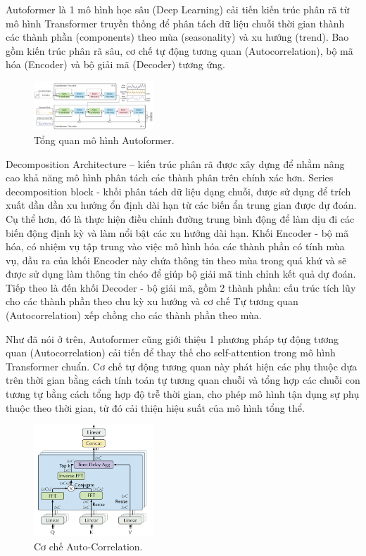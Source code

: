 Autoformer là 1 mô hình học sâu (Deep Learning) cải tiến kiến trúc phân rã từ mô hình Transformer truyền thống để phân tách dữ liệu chuỗi thời gian thành các thành phần (components) theo mùa (seasonality) và xu hướng (trend). Bao gồm kiến trúc phân rã sâu, cơ chế tự động tương quan (Autocorrelation), bộ mã hóa (Encoder) và bộ giải mã (Decoder) tương ứng.

\begin{figure}[htbp]
\centerline{\includegraphics[width=0.4\textwidth]{img/autoformer.jpg}}
\caption{Tổng quan mô hình Autoformer.}
\label{fig}
\end{figure}

Decomposition Architecture – kiến trúc phân rã được xây dựng để nhằm nâng cao khả năng mô hình phân tách các thành phân trên chính xác hơn. Series decomposition block - khối phân tách dữ liệu dạng chuỗi, được sử dụng để trích xuất dần dần xu hướng ổn định dài hạn từ các biến ẩn trung gian được dự đoán. Cụ thể hơn, đó là thực hiện điều chỉnh đường trung bình động để làm dịu đi các biến động định kỳ và làm nổi bật các xu hướng dài hạn. Khối Encoder - bộ mã hóa, có nhiệm vụ tập trung vào việc mô hình hóa các thành phần có tính mùa vụ, đầu ra của khối Encoder này chứa thông tin theo mùa trong quá khứ và sẽ được sử dụng làm thông tin chéo để giúp bộ giải mã tinh chỉnh kết quả dự đoán. Tiếp theo là đến khối Decoder - bộ giải mã, gồm 2 thành phần: cấu trúc tích lũy cho các thành phần theo chu kỳ xu hướng và cơ chế Tự tương quan (Autocorrelation) xếp chồng cho các thành phần theo mùa. 

Như đã nói ở trên, Autoformer cũng giới thiệu 1 phương pháp tự động tương quan (Autocorrelation) cải tiến để thay thế cho self-attention trong mô hình Transformer chuẩn. Cơ chế tự động tương quan này phát hiện các phụ thuộc dựa trên thời gian bằng cách tính toán tự tương quan chuỗi và tổng hợp các chuỗi con tương tự bằng cách tổng hợp độ trễ thời gian, cho phép mô hình tận dụng sự phụ thuộc theo thời gian, từ đó cải thiện hiệu suất của mô hình tổng thể.

\begin{figure}[htbp]
\centerline{\includegraphics[width=0.4\textwidth]{img/autocorrelation.png}}
\caption{Cơ chế Auto-Correlation.}
\label{fig}
\end{figure}